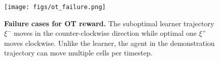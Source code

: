 
\begin{figure}
    \centering
    \texttt{[image: figs/ot\_failure.png]}
    \caption{\small \textbf{Failure cases for OT reward.} 
    The suboptimal learner trajectory $\xi^-$ moves in the counter-clockwise direction while optimal one $\xi^{+}$ moves clockwise. Unlike the learner, the agent in the demonstration trajectory can move multiple cells per timestep. }
    \label{fig:ot_fail}
\end{figure}